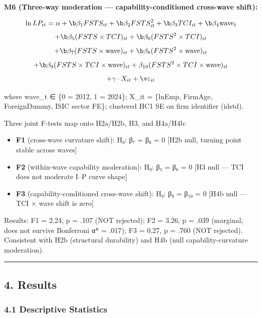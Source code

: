 \documentclass[12pt,a4paper]{article}
\providecommand{\tightlist}{\setlength{\itemsep}{0pt}\setlength{\parskip}{0pt}}
\begin{document}
\textbf{M6 (Three-way moderation --- capability-conditioned cross-wave
shift):}

\[\ln LP_{it} = \alpha + \b\beta_1 FSTS_{it} + \b\beta_2 FSTS^2_{it} + \b\beta_3 TCI_{it} + \b\beta_4 \text{wave}_t\]
\[+ \b\beta_5 (FSTS \times TCI)_{it} + \b\beta_6 (FSTS^2 \times TCI)_{it}\]
\[+ \b\beta_7 (FSTS \times \text{wave})_{it} + \b\beta_8 (FSTS^2 \times \text{wave})_{it}\]
\[+ \b\beta_9 (FSTS \times TCI \times \text{wave})_{it} + \beta_{10} (FSTS^2 \times TCI \times \text{wave})_{it}\]
\[+ \gamma \cdot X_{it} + \v\varepsilon_{it}\]

where wave\_t ∈ \{0 = 2012, 1 = 2024\}; X\_it = \{lnEmp, FirmAge,
ForeignDummy, ISIC sector FE\}; clustered HC1 SE on firm identifier
(idstd).

Three joint F-tests map onto H2a/H2b, H3, and H4a/H4b:

\begin{itemize}
\tightlist
\item
  \textbf{F1} (cross-wave curvature shift): H₀: β₇ = β₈ = 0 {[}H2b null,
  turning point stable across waves{]}
\item
  \textbf{F2} (within-wave capability moderation): H₀: β₅ = β₆ = 0 {[}H3
  null --- TCI does not moderate I--P curve shape{]}
\item
  \textbf{F3} (capability-conditioned cross-wave shift): H₀: β₉ = β₁₀ =
  0 {[}H4b null --- TCI × wave shift is zero{]}
\end{itemize}

Results: F1 = 2.24, p = .107 (NOT rejected); F2 = 3.26, p = .039
(marginal; does not survive Bonferroni α* = .017); F3 = 0.27, p = .760
(NOT rejected). Consistent with H2b (structural durability) and H4b
(null capability-curvature moderation).

\begin{center}\rule{0.5\linewidth}{0.5pt}\end{center}

\hypertarget{4-results}{%
\subsection{4. Results}\label{4-results}}

\hypertarget{41-descriptive-statistics}{%
\subsubsection{4.1 Descriptive
Statistics}\label{41-descriptive-statistics}}
\end{document}
